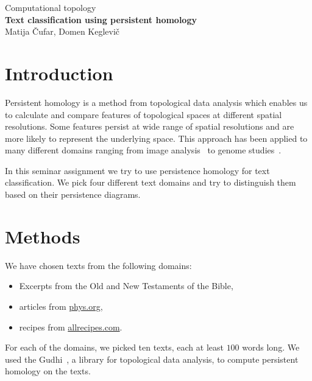 \documentclass[12pt,a4paper]{amsart}
\begin{document}
\thispagestyle{empty}
\begin{center}{\large
Computational topology\\[4mm]
{\bf Text classification using persistent homology}\\[4mm]
Matija Čufar, Domen Keglevič\\[6mm]
}
\end{center}
\bigskip

\section{Introduction}
Persistent homology is a method from topological data analysis which enables us
to calculate and compare features of topological spaces at different spatial
resolutions. Some features persist at wide range of spatial resolutions and are
more likely to represent the underlying space. This approach has been applied to
many different domains ranging from image analysis~\cite{nakane2015homology} to
genome studies~\cite{camara2016topological}.

In this seminar assignment we try to use persistence homology for text
classification. We pick four different text domains and try to distinguish them
based on their persistence diagrams.

\section{Methods}

We have chosen texts from the following domains:

\begin{itemize}
  \setlength\itemsep{0.5em}
\item Excerpts from the Old and New Testaments of the Bible,
\item articles from \url{phys.org},
\item recipes from \url{allrecipes.com}.
\end{itemize}

For each of the domains, we picked ten texts, each at least $100$ words long. We
used the Gudhi~\cite{maria2014gudhi}, a library for topological data analysis,
to compute persistent homology on the texts.
\end{document}
